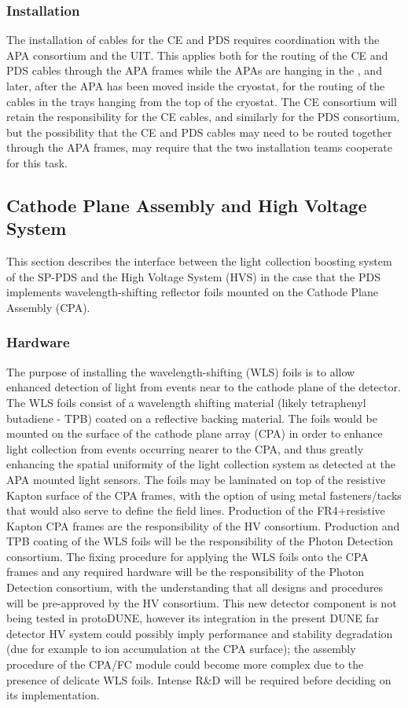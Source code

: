 \subsubsection{Installation} 
The installation of  cables for the CE and PDS requires coordination with the APA consortium and the UIT. This applies both for the routing of the CE and PDS cables through the APA frames while the APAs are hanging in the , and later, after the APA has been moved inside the cryostat, for the routing of the cables in the trays hanging from the top of the cryostat. The CE consortium will retain the responsibility for the CE cables, and similarly for the PDS consortium, but the possibility that the CE and PDS cables may need to be routed together through the APA frames, may require that the two installation teams cooperate for this task.

\subsection{Cathode Plane Assembly  and High Voltage System}
\label{sec:fdsp-pd-intfc-le}

This section describes the interface between the light collection boosting system of the SP-PDS and the High Voltage System (HVS) in the case that the PDS implements wavelength-shifting reflector foils mounted on the Cathode Plane Assembly (CPA).

\subsubsection{Hardware}
The purpose of installing the wavelength-shifting (WLS) foils is to allow enhanced detection of light from events near to the cathode plane of the detector. The WLS foils consist of a wavelength shifting material (likely tetraphenyl butadiene - TPB) coated on a reflective backing material. The foils would be mounted on the surface of the cathode plane array (CPA) in order to enhance light collection from events occurring nearer to the CPA, and thus greatly enhancing the spatial uniformity of the light collection system as detected at the APA mounted light sensors. The foils may be laminated on top of the resistive Kapton surface of the CPA frames, with the option of using metal fasteners/tacks that would also serve to define the field lines. Production of the FR4+resistive Kapton CPA frames are the responsibility of the HV consortium. Production and TPB coating of the WLS foils will be the responsibility of the Photon Detection consortium. The fixing procedure for applying the WLS foils onto the CPA frames and any required hardware will be the responsibility of the Photon Detection consortium, with the understanding that all designs and procedures will be pre-approved by the HV consortium. This new detector component is not being tested in protoDUNE, however its integration in the present DUNE far detector HV system could possibly imply performance and stability degradation (due for example to ion accumulation at the CPA surface); the assembly procedure of the CPA/FC module could become more complex due to the presence of delicate WLS foils. Intense R\&D will be required before deciding on its implementation.

